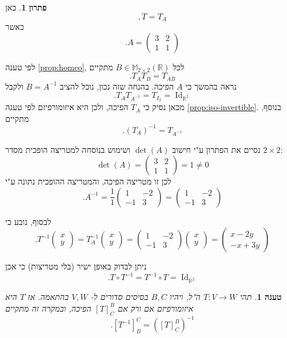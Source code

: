 \documentclass[12pt]{report}
\theoremstyle{plain}
\newtheorem{proposition}[theorem]{טענה}
\theoremstyle{definition}
\newtheorem*{solution}{פתרון}
\newcommand{\R}{\mathbb{R}}
\newcommand{\M}{\mathbb{M}}
\newcommand{\0}{\mathbf{0}}
\DeclareMathOperator{\Id}{Id}
\begin{document}
\begin{solution}
כאן
$$
,T=T_A
$$
כאשר
$$
.A=\begin{pmatrix}
3 & 2 \\
1 & 1
\end{pmatrix}
$$

לפי טענה 
\ref{prop:homeo},
לכל
$B\in\M_{2\times 2}(\R)$
מתקיים
$$
.T_A T_B=T_{AB}
$$
נראה בהמשך כי
$A$
הפיכה. בהנחה שזה נכון, נוכל להציב
$B=A^{-1}$
ולקבל
$$
.T_A T_{A^{-1}}=T_{I_2}=\Id_{\R^2}
$$
מכאן נסיק כי 
$T_A$
הפיכה, ולכן היא איזומורפיזם לפי טענה
\ref{prop:iso-invertible}. 
בנוסף, מתקיים
$$
.(T_{A})^{-1}=T_{A^{-1}}
$$

נסיים את הפתרון ע"י חישוב
$\det(A)$
ושימוש בנוסחה למטריצה הופכית מסדר
$2\times 2$:
$$
\det(A)=\begin{pmatrix}
3 & 2 \\
1 & 1
\end{pmatrix}=1\neq 0
$$
לכן זו מטריצה הפיכה, והמטריצה ההופכית נתונה ע"י
$$
.A^{-1}=\frac{1}{1}\begin{pmatrix}
1 & -2 \\
-1 & 3
\end{pmatrix}=\begin{pmatrix}
1 & -2 \\
-1 & 3
\end{pmatrix}
$$

לבסוף, נובע כי
$$
.T^{-1}\begin{pmatrix}x\\y\end{pmatrix}=T_A^{-1}\begin{pmatrix}x\\y\end{pmatrix}=\begin{pmatrix}
1 & -2 \\
-1 & 3
\end{pmatrix}\begin{pmatrix}x\\y\end{pmatrix}=\begin{pmatrix}x-2y\\-x+3y\end{pmatrix}
$$

ניתן לבדוק באופן ישיר (בלי מטריצות) כי אכן
$$
.T\circ T^{-1}=T^{-1}\circ T=\Id_{\R^2}
$$

\end{solution}

\begin{proposition}\label{prop:iso-by-matrix}
תהי
$T:V\to W$
ה"ל, ויהיו
$B,C$
בסיסים סדורים ל-
$V,W$
בהתאמה. אז 
$T$
היא איזומורפיזם אם ורק אם
$[T]_C^B$
הפיכה, ובמקרה זה מתקיים
$$
.[T^{-1}]_B^C=([T]_C^B)^{-1}
$$
\end{proposition}
\end{document}

